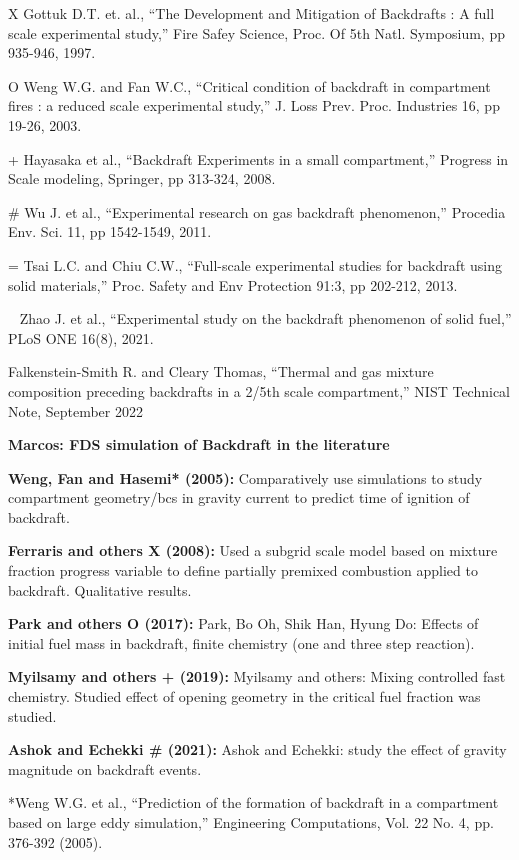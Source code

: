 \documentclass[12pt,letterpaper]{article}
\begin{document}
\begin{flushleft}
X Gottuk D.T. et. al., “The Development and Mitigation of Backdrafts : A full scale experimental study,” Fire Safey Science, Proc. Of 5th Natl. Symposium, pp 935-946, 1997. 

O Weng W.G. and Fan W.C., “Critical condition of backdraft in compartment fires : a reduced scale experimental study,” J. Loss Prev. Proc. Industries 16, pp 19-26, 2003.

+ Hayasaka et al., “Backdraft Experiments in a small compartment,” Progress in Scale modeling, Springer, pp 313-324, 2008.

# Wu J. et al., “Experimental research on gas backdraft phenomenon,” Procedia Env. Sci. 11, pp 1542-1549, 2011.

= Tsai L.C. and Chiu C.W., “Full-scale experimental studies for backdraft using solid materials,” Proc. Safety and Env Protection 91:3, pp 202-212, 2013.

~ Zhao J. et al., “Experimental study on the backdraft phenomenon of solid fuel,” PLoS ONE 16(8), 2021.

Falkenstein-Smith R. and Cleary Thomas, “Thermal and gas mixture composition preceding backdrafts in a 2/5th scale compartment,” NIST Technical Note, September 2022


\textbf{Marcos: FDS simulation of Backdraft in the literature}

\textbf{Weng, Fan and Hasemi* (2005):}
Comparatively use simulations to study compartment geometry/bcs in gravity current to predict time of ignition of backdraft.


\textbf{Ferraris and others X (2008):}
Used a subgrid scale model based on mixture fraction progress variable to define partially premixed combustion applied to backdraft. Qualitative results.


\textbf{Park and others O (2017):} Park, Bo Oh, Shik Han, Hyung Do: Effects of initial fuel mass in backdraft, finite chemistry (one and three step reaction).


\textbf{Myilsamy and others + (2019):} Myilsamy and others: Mixing controlled fast chemistry. Studied effect of opening geometry in the critical fuel fraction was studied.


\textbf{Ashok and Echekki # (2021):} Ashok and Echekki: study the effect of gravity magnitude on backdraft events. 

*Weng W.G. et al., “Prediction of the formation of backdraft in a compartment based on large eddy simulation,” Engineering Computations, Vol. 22 No. 4, pp. 376-392 (2005).


\end{flushleft}
\end{document}
